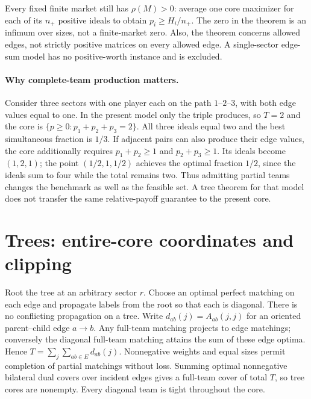 \documentclass[11pt]{article}
\theoremstyle{remark}\newtheorem{remark}[theorem]{Remark}
\begin{document}
Every fixed finite market still has $\rho(M)>0$: average one core maximizer
for each of its $n_+$ positive ideals to obtain $p_i\ge H_i/n_+$.
The zero in the theorem is an infimum over sizes, not a finite-market zero.
Also, the theorem concerns allowed edges, not strictly positive matrices on
every allowed edge. A single-sector edge-sum model has no positive-worth
instance and is excluded.

\paragraph{Why complete-team production matters.}
Consider three sectors with one player each on the path $1$--$2$--$3$, with
both edge values equal to one. In the present model only the triple produces,
so $T=2$ and the core is $\{p\ge0:p_1+p_2+p_3=2\}$. All three ideals equal
two and the best simultaneous fraction is $1/3$. If adjacent pairs can also
produce their edge values, the core additionally requires
$p_1+p_2\ge1$ and $p_2+p_3\ge1$. Its ideals become $(1,2,1)$; the point
$(1/2,1,1/2)$ achieves the optimal fraction $1/2$, since the ideals sum to
four while the total remains two. Thus admitting partial teams changes the
benchmark as well as the feasible set. A tree theorem for that model does
not transfer the same relative-payoff guarantee to the present core.


\section{Trees: entire-core coordinates and clipping}
Root the tree at an arbitrary sector $r$. Choose an optimal perfect matching
on each edge and propagate labels from the root so that each is diagonal.
There is no conflicting propagation on a tree. Write $d_{ab}(j)=A_{ab}(j,j)$
for an oriented parent--child edge $a\to b$. Any full-team matching projects
to edge matchings; conversely the diagonal full-team matching attains the sum
of these edge optima. Hence
$T=\sum_j\sum_{ab\in E}d_{ab}(j)$.
Nonnegative weights and equal sizes permit completion of partial matchings
without loss. Summing optimal nonnegative bilateral dual covers over incident
edges gives a full-team cover of total $T$, so tree cores are nonempty.
Every diagonal team is tight throughout the core.
\end{document}

